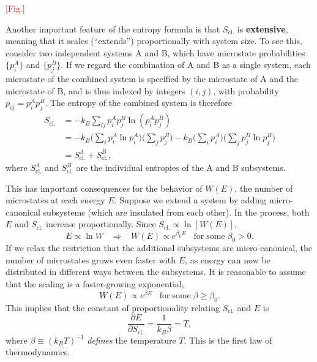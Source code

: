 \documentclass[pra,11pt]{revtex4}
\begin{document}
\textcolor{red}{[Fig.]}

Another important feature of the entropy formula is that
$S_{\mathrm{cl.}}$ is \textbf{extensive}, meaning that it scales
(``extends'') proportionally with system size.  To see this, consider
two independent systems A and B, which have microstate probabilities
$\{p_i^A\}$ and $\{p_j^B\}$.  If we regard the combination of A and B
as a single system, each microstate of the combined system is
specified by the microstate of A and the microstate of B, and is thus
indexed by integers $(i,j)$, with probability $p_{ij} = p^A_ip^B_j$.
The entropy of the combined system is therefore
$$\begin{aligned}S_{\mathrm{cl.}} &= - k_B \sum_{ij} p_i^Ap^B_j \ln\left(p^A_ip^B_j\right) \\
  &= - k_B \Big(\sum_{i} p^A_i \ln p^A_i\Big)\Big(\sum_j p^B_j\Big)
  - k_B \Big(\sum_{i} p^A_i \Big) \Big(\sum_j p^B_j \ln p^B_j\Big) \\
  &= S_{\mathrm{cl.}}^A + S_{\mathrm{cl.}}^B,
\end{aligned}$$
where $S_{\mathrm{cl.}}^A$ and $S_{\mathrm{cl.}}^B$ are the individual
entropies of the A and B subsystems.

This has important consequences for the behavior of $W(E)$, the number
of microstates at each energy $E$.  Suppose we extend a system by
adding micro-canonical subsystems (which are insulated from each
other).  In the process, both $E$ and $S_{\mathrm{cl.}}$ increase
proportionally.  Since $S_{\mathrm{cl.}} \propto \ln[W(E)]$,
$$E \propto \ln W \;\;\;\Rightarrow \;\;\;W(E) \propto e^{\beta_0 E} \;\;\; \mathrm{for\;some}\; \beta_0 > 0.$$
If we relax the restriction that the additional subsystems are
micro-canonical, the number of microstates grows even faster with $E$,
as energy can now be distributed in different ways between the
subsystems.  It is reasonable to assume that the scaling is a
faster-growing exponential,
$$W(E) \propto e^{\beta E} \;\;\; \mathrm{for\;some}\; \beta \ge \beta_0.$$
This implies that the constant of proportionality relating
$S_{\mathrm{cl.}}$ and $E$ is
$$\frac{\partial E}{\partial S_{\mathrm{cl.}}} = \frac{1}{k_B \beta} = T,$$
where $\beta \equiv (k_BT)^{-1}$ \textit{defines} the temperature $T$.
This is the first law of thermodynamics.
\end{document}
